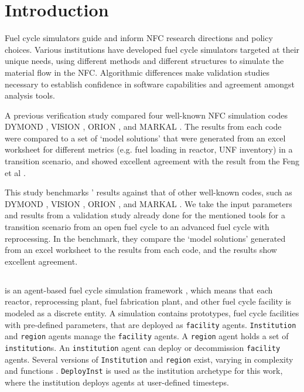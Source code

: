
\section{Introduction}
Fuel cycle simulators guide and inform \gls{NFC} research directions and policy choices.
Various institutions have developed fuel cycle simulators targeted at their unique needs,
using different methods and different structures
to simulate the material flow in the \gls{NFC}.
Algorithmic differences make
validation studies necessary to establish
confidence in software capabilities and
agreement amongst analysis tools.

A previous verification study \cite{feng_standardized_2016} compared
four well-known \gls{NFC} simulation codes
DYMOND \cite{yacout_modeling_2005},
VISION \cite{jacobson_verifiable_2010},
ORION \cite{gregg_analysis_2012}, and
MARKAL \cite{shay_epa_2006}. The results from each code
were compared to a set of `model solutions' that were generated
from an excel worksheet for different metrics (e.g. fuel loading in reactor,
\gls{UNF} inventory) in a transition scenario, and showed excellent agreement
with the result from the Feng et al \cite{feng_standardized_2016}.


This study benchmarks \Cyclus' results
against that of other well-known codes, such as
DYMOND \cite{yacout_modeling_2005},
VISION \cite{jacobson_verifiable_2010},
ORION \cite{gregg_analysis_2012}, and
MARKAL \cite{shay_epa_2006}. We take the input
parameters and results from a validation study
\cite{feng_standardized_2016} already done for the
mentioned tools for a transition scenario from an
open fuel cycle to an advanced fuel cycle with
reprocessing. In the benchmark, they compare the `model solutions'
generated from an excel worksheet
to the results from each code, and the results show
excellent agreement.


\subsection{\Cyclus}

\Cyclus is an agent-based fuel cycle simulation framework 
\cite{huff_fundamental_2016}, which means 
that each reactor, reprocessing plant, fuel fabrication plant, and other fuel cycle
facility is modeled as a discrete entity.
A \Cyclus simulation contains prototypes, fuel cycle facilities with
pre-defined parameters, that are deployed as \texttt{facility} agents.
\texttt{Institution} and \texttt{region} agents manage the \texttt{facility} agents.
A \texttt{region} agent holds a set of \texttt{institution}s.
An \texttt{institution} agent can deploy or decommission \texttt{facility} agents.
Several versions of \texttt{Institution}
and \texttt{region} exist, varying in complexity and functions \cite{huff_extensions_2014}.
 \texttt{DeployInst} is used as the institution archetype for this work, where the institution
deploys agents at user-defined timesteps.
